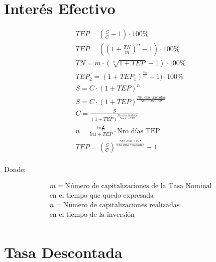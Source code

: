 \documentclass[a4paper, twocolumn]{article}
\begin{document}
\section{Interés Efectivo}

\begin{gather*}
    TEP = (\frac{S}{C} - 1) \cdot 100 \% \\
    TEP = ((1 + \frac{TN}{m})^n - 1) \cdot 100 \% \\
    TN = m \cdot (\sqrt[n]{1 + TEP} - 1) \cdot 100 \% \\
    TEP_2 = (1 + TEP_1)^{\frac{n_2}{n_1}} - 1) \cdot 100 \% \\
    S = C \cdot (1 + TEP)^n \\
    S = C \cdot (1 + TEP)^{\frac{\text{Nro días trasladar}}{\text{Nro días TEP}}} \\
    C = \frac{S}{(1 + TEP)^{\frac{\text{Nro días trasladar}}{\text{Nro días TEP}}}} \\
    n = \frac{ln{\frac{S}{C}}}{ln{1 + TEP}} \cdot {\text{Nro días TEP}} \\
    TEP = (\frac{S}{C})^{\frac{\text{Nro días TEP}}{\text{Nro días trasladar}}} - 1 \\
\end{gather*}

Donde:

\begin{gather*}
    m = \text{Número de capitalizaciones de la Tasa Nominal} \\
    \text{en el tiempo que quedo expresada} \\
    n = \text{Número de capitalizaciones realizadas} \\
    \text{en el tiempo de la inversión} \\
\end{gather*}

\section{Tasa Descontada}
\end{document}
